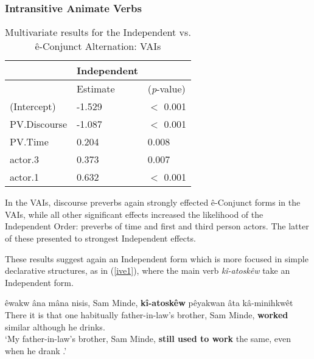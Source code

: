             
            
            
            
    
    \subsubsection{Intransitive Animate Verbs}
            \begin{table}[H]
            \centering
            \begin{tabular}{lll}
            \toprule
                                    & \textbf{Independent} \\
                    \midrule
                        & Estimate    & (\textit{p}-value) & \\
            \midrule
(Intercept) & -1.529 & $<$ 0.001 \\
PV.Discourse & -1.087 & $<$ 0.001 \\
PV.Time & 0.204 & 0.008 \\
actor.3 & 0.373 & 0.007 \\
actor.1 & 0.632 & $<$ 0.001 \\
            \bottomrule
            \end{tabular}
            \caption{
               Multivariate results for the Independent vs. ê-Conjunct Alternation: VAIs \\ \label{tab:tiivcmv}
              }
            \end{table}
            
         In the VAIs, discourse preverbs again strongly effected ê-Conjunct forms in the VAIs, while all other significant effects increased the likelihood of the Independent Order: preverbs of time and first and third person actors. The latter of these presented to strongest Independent effects.  

         These results suggest again an Independent form which is more focused in simple declarative structures, as in (\ref{ive1}), where the main verb \textit{kî-atoskêw} take an Independent form. 


        \begin{exe}
        \ex
        \gll  êwakw âna mâna nisis, Sam Minde, \textbf{kî-atoskêw} pêyakwan âta kâ-minihkwêt \\
              {There it is} {that one} {habitually} {father-in-law's brother}, Sam Minde, \textbf{worked} similar although {he drinks}.\\
        \trans `My father-in-law's brother, Sam Minde, \textbf{still used to work} the same, even when he drank \citep[102]{Minde1997kwayask}.'
        \label{ive1}
        \end{exe}
        
